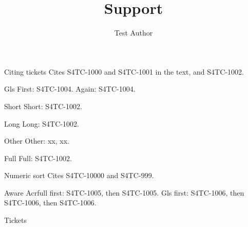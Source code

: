 \documentclass[aspectratio=169,10pt]{beamer}
\title{Support}
\author{Test Author}
\begin{document}
\begin{frame}{Citing tickets}
	Cites \acrshort{S4TC-1000} and \acrshort{S4TC-1001} in the text, and \acrshort{S4TC-1002}.
\end{frame}
\begin{frame}{Gls}
	First: \gls{S4TC-1004}. Again: \gls{S4TC-1004}.
\end{frame}
\begin{frame}{Short}
	Short: \acrshort{S4TC-1002}.
\end{frame}
\begin{frame}{Long}
	Long: \acrlong{S4TC-1002}.
\end{frame}
\begin{frame}{Other}
	Other: \gls{xx}, \acrfull{xx}.
\end{frame}
\begin{frame}{Full}
	Full: \acrfull{S4TC-1002}.
\end{frame}
\begin{frame}{Numeric sort}
	Cites \acrshort{S4TC-10000} and \acrshort{S4TC-999}.
\end{frame}
\begin{frame}{Aware}
	Acrfull first: \acrfull{S4TC-1005}, then \gls{S4TC-1005}. Gls first: \gls{S4TC-1006}, then \acrfull{S4TC-1006}, then \gls{S4TC-1006}.
\end{frame}
\begin{frame}[allowframebreaks]{Tickets}
	\printjiraglossary
\end{frame}
\end{document}
